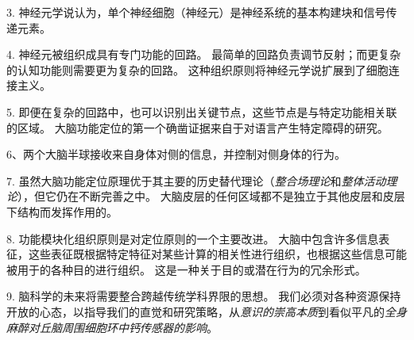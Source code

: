 3. 神经元学说认为，单个神经细胞（神经元）是神经系统的基本构建块和信号传递元素。


4. 神经元被组织成具有专门功能的回路。
最简单的回路负责调节反射；而更复杂的认知功能则需要更为复杂的回路。
这种组织原则将神经元学说扩展到了细胞连接主义。


5. 即便在复杂的回路中，也可以识别出关键节点，这些节点是与特定功能相关联的区域。
大脑功能定位的第一个确凿证据来自于对语言产生特定障碍的研究。


6、两个大脑半球接收来自身体对侧的信息，并控制对侧身体的行为。


7. 虽然大脑功能定位原理优于其主要的历史替代理论（\textit{整合场理论}和\textit{整体活动理论}），但它仍在不断完善之中。
大脑皮层的任何区域都不是独立于其他皮层和皮层下结构而发挥作用的。


8. 功能模块化组织原则是对定位原则的一个主要改进。
大脑中包含许多信息表征，这些表征既根据特定特征对某些计算的相关性进行组织，也根据这些信息可能被用于的各种目的进行组织。
这是一种关于目的或潜在行为的冗余形式。


9. 脑科学的未来将需要整合跨越传统学科界限的思想。
我们必须对各种资源保持开放的心态，以指导我们的直觉和研究策略，从\textit{意识的崇高本质}到看似平凡的\textit{全身麻醉对丘脑周围细胞环中钙传感器的影响}。



















